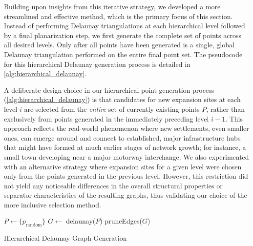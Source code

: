 Building upon insights from this iterative strategy, we developed a more streamlined and effective method, which is the primary focus of this section.
Instead of performing Delaunay triangulations at each hierarchical level followed by a final planarization step, we first generate the complete set of points across all desired levels.
Only after all points have been generated is a single, global Delaunay triangulation performed on the entire final point set.
The pseudocode for this hierarchical Delaunay generation process is detailed in \cref{alg:hierarchical_delaunay}.

A deliberate design choice in our hierarchical point generation process (\cref{alg:hierarchical_delaunay}) is that candidates for new expansion sites at each level \(i\) are selected from the \emph{entire} set of currently existing points \(P\), rather than exclusively from points generated in the immediately preceding level \(i-1\).
This approach reflects the real-world phenomenon where new settlements, even smaller ones, can emerge around and connect to established, major infrastructure hubs that might have formed at much earlier stages of network growth; for instance, a small town developing near a major motorway interchange.
We also experimented with an alternative strategy where expansion sites for a given level were chosen only from the points generated in the previous level.
However, this restriction did not yield any noticeable differences in the overall structural properties or separator characteristics of the resulting graphs, thus validating our choice of the more inclusive selection method.

\begin{algorithm}[tbhp]
	\BlankLine
	\(P \longleftarrow \{p_\text{random}\}\)\;
	\BlankLine
	\BlankLine
	\(G \longleftarrow\) delaunay(\(P\))\;
	pruneEdges(\(G\))\;
	\;
	\caption{Hierarchical Delaunay Graph Generation}
	\label{alg:hierarchical_delaunay}
\end{algorithm}

